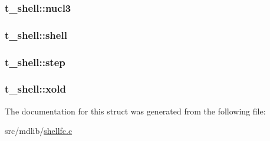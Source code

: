 \hypertarget{structt__shell_ad5f17b5b0c2fc6aa0dadb5fe44f78cf2}{
\subsubsection[{nucl3}]{ {\bf t\-\_\-shell\-::nucl3}}}\label{structt__shell_ad5f17b5b0c2fc6aa0dadb5fe44f78cf2}
\hypertarget{structt__shell_a4c296b695ffca1aa1e4826807c6b279b}{
\subsubsection[{shell}]{ {\bf t\-\_\-shell\-::shell}}}\label{structt__shell_a4c296b695ffca1aa1e4826807c6b279b}
\hypertarget{structt__shell_a0d9ed1e4ad2230952e57174f36fcc12d}{
\subsubsection[{step}]{ {\bf t\-\_\-shell\-::step}}}\label{structt__shell_a0d9ed1e4ad2230952e57174f36fcc12d}
\hypertarget{structt__shell_ae83b9774064ec104e760a99c88194efb}{
\subsubsection[{xold}]{ {\bf t\-\_\-shell\-::xold}}}\label{structt__shell_ae83b9774064ec104e760a99c88194efb}


\-The documentation for this struct was generated from the following file\-:\begin{DoxyCompactItemize}
\item 
src/mdlib/\hyperlink{shellfc_8c}{shellfc.\-c}\end{DoxyCompactItemize}
